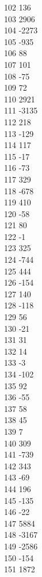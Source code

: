 { 102	136 \\
 103	2906 \\
 104	-2273 \\
 105	-935 \\
 106	88 \\
 107	101 \\
 108	-75 \\
 109	72 \\
 110	2921 \\
 111	-3135 \\
 112	218 \\
 113	-129 \\
 114	117 \\
 115	-17 \\
 116	-73 \\
 117	329 \\
 118	-678 \\
 119	410 \\
 120	-58 \\
 121	80 \\
 122	-1 \\
 123	325 \\
 124	-744 \\
 125	444 \\
 126	-154 \\
 127	140 \\
 128	-118 \\
 129	56 \\
 130	-21 \\
 131	31 \\
 132	14 \\
 133	-3 \\
 134	-102 \\
 135	92 \\
 136	-55 \\
 137	58 \\
 138	45 \\
 139	7 \\
 140	309 \\
 141	-739 \\
 142	343 \\
 143	-69 \\
 144	196 \\
 145	-135 \\
 146	-22 \\
 147	5884 \\
 148	-3167 \\
 149	-2586 \\
 150	-154 \\
 151	1872 \\
}
